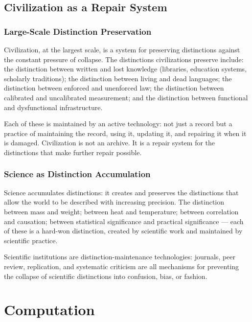 \documentclass[12pt,a4paper]{book}
\theoremstyle{remark}
\theoremstyle{definition}
\begin{document}
\chapter{Civilization as a Repair System}

\section{Large-Scale Distinction Preservation}

Civilization, at the largest scale, is a system for preserving
distinctions against the constant pressure of collapse. The distinctions
civilizations preserve include: the distinction between written and lost
knowledge (libraries, education systems, scholarly traditions); the
distinction between living and dead languages; the distinction between
enforced and unenforced law; the distinction between calibrated and
uncalibrated measurement; and the distinction between functional and
dysfunctional infrastructure.

Each of these is maintained by an active technology: not just a record
but a practice of maintaining the record, using it, updating it, and
repairing it when it is damaged. Civilization is not an archive. It is
a repair system for the distinctions that make further repair possible.

\section{Science as Distinction Accumulation}

Science accumulates distinctions: it creates and preserves the distinctions
that allow the world to be described with increasing precision. The
distinction between mass and weight; between heat and temperature; between
correlation and causation; between statistical significance and practical
significance --- each of these is a hard-won distinction, created by
scientific work and maintained by scientific practice.

Scientific institutions are distinction-maintenance technologies: journals,
peer review, replication, and systematic criticism are all mechanisms for
preventing the collapse of scientific distinctions into confusion, bias,
or fashion.

\part{Computation}
\end{document}
